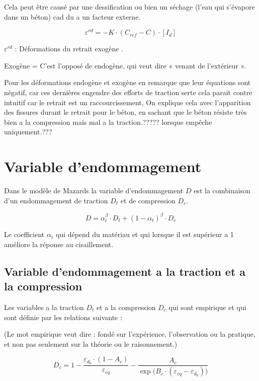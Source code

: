 \documentclass[12pt,a4paper]{report}
\begin{document}
	Cela peut être causé par une dessification ou bien un séchage (l'eau qui s'évapore dans un béton) cad du a un facteur externe.
	
	\[ \varepsilon^{rd} =  - K \cdot (C_{ref} - C) \cdot [I_{d}] \]
	
	$\varepsilon^{rd}$ : Déformations du retrait exogène .
	
	Exogène = C’est l’opposé de endogène, qui veut dire « venant de l’extérieur ».
	
	
	\begin{tcolorbox}[colback=gray!20, colframe=black, title=Remarque]
		Pour les déformations endogène et exogène en remarque que leur équations sont négatif, car ces dernières engendre des efforts de traction serte cela parait contre intuitif car le retrait est un raccourcissement, On explique cela avec l'apparition des fissures durant le retrait pour le béton, en sachant que le béton résiste très bien a la compression mais mal a la traction.????? lorsque empêche uniquement.???
	\end{tcolorbox}
	
	
	
	
	\section{Variable d'endommagement}
	
	Dans le modèle de Mazards la variable d'endommagement $D$ est la combinaison d'un endommagement de traction $D_{t}$ et de compression $D_{c}$.
	
	\[ D = \alpha^{\beta}_{t} \cdot D_{t} + (1 - \alpha_{t})^{\beta} \cdot D_{c} \]
	
	
	Le coefficient $\alpha_{t}$ qui dépend du matériau et qui lorsque il est supérieur a 1 améliore la réponse au cisaillement.
	
	
	\subsection{Variable d'endommagement a la traction et a la compression}
	
	Les variables a la traction $D_{t}$ et a la compression $D_{c}$ qui sont empirique et qui sont définie par les relations suivante : 
	
	(Le mot empirique veut dire : fondé sur l’expérience, l’observation ou la pratique, et non pas seulement sur la théorie ou le raisonnement.)
	
	\[ D_{c} = 1 - 
	\dfrac{\varepsilon_{d_{0}} \cdot (1 - A_{c})}{\varepsilon_{eq}}  
	- \dfrac{A_{c}}{\exp\bigg(B_{c} \cdot (\varepsilon_{eq} - \varepsilon_{d_{0}})\bigg)} \]
	
\end{document}
